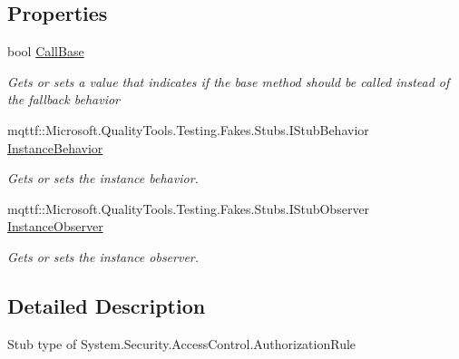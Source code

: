 \subsection*{Properties}
\begin{DoxyCompactItemize}
\item 
bool \hyperlink{class_system_1_1_security_1_1_access_control_1_1_fakes_1_1_stub_authorization_rule_aa9ff1bd47bd8638cc3dd5c8cf2e81ec7}{Call\-Base}
\begin{DoxyCompactList}\small\item\em Gets or sets a value that indicates if the base method should be called instead of the fallback behavior\end{DoxyCompactList}\item 
mqttf\-::\-Microsoft.\-Quality\-Tools.\-Testing.\-Fakes.\-Stubs.\-I\-Stub\-Behavior \hyperlink{class_system_1_1_security_1_1_access_control_1_1_fakes_1_1_stub_authorization_rule_a84025f0678ca30bc8f2c41a7d6c3a0ff}{Instance\-Behavior}
\begin{DoxyCompactList}\small\item\em Gets or sets the instance behavior.\end{DoxyCompactList}\item 
mqttf\-::\-Microsoft.\-Quality\-Tools.\-Testing.\-Fakes.\-Stubs.\-I\-Stub\-Observer \hyperlink{class_system_1_1_security_1_1_access_control_1_1_fakes_1_1_stub_authorization_rule_a225c94db866aac6e2585610547c682d1}{Instance\-Observer}
\begin{DoxyCompactList}\small\item\em Gets or sets the instance observer.\end{DoxyCompactList}\end{DoxyCompactItemize}


\subsection{Detailed Description}
Stub type of System.\-Security.\-Access\-Control.\-Authorization\-Rule




